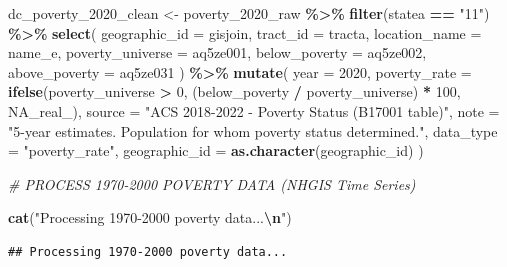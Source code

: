 \documentclass[
]{article}
\newenvironment{Shaded}{\begin{snugshade}}{\end{snugshade}}
\newcommand{\AttributeTok}[1]{\textcolor[rgb]{0.13,0.29,0.53}{#1}}
\newcommand{\CommentTok}[1]{\textcolor[rgb]{0.56,0.35,0.01}{\textit{#1}}}
\newcommand{\ConstantTok}[1]{\textcolor[rgb]{0.56,0.35,0.01}{#1}}
\newcommand{\DecValTok}[1]{\textcolor[rgb]{0.00,0.00,0.81}{#1}}
\newcommand{\FunctionTok}[1]{\textcolor[rgb]{0.13,0.29,0.53}{\textbf{#1}}}
\newcommand{\NormalTok}[1]{#1}
\newcommand{\OtherTok}[1]{\textcolor[rgb]{0.56,0.35,0.01}{#1}}
\newcommand{\SpecialCharTok}[1]{\textcolor[rgb]{0.81,0.36,0.00}{\textbf{#1}}}
\newcommand{\StringTok}[1]{\textcolor[rgb]{0.31,0.60,0.02}{#1}}
\begin{document}
\begin{Shaded}
\begin{Highlighting}[]
\NormalTok{dc\_poverty\_2020\_clean }\OtherTok{\textless{}{-}}\NormalTok{ poverty\_2020\_raw }\SpecialCharTok{\%\textgreater{}\%}
  \FunctionTok{filter}\NormalTok{(statea }\SpecialCharTok{==} \StringTok{"11"}\NormalTok{) }\SpecialCharTok{\%\textgreater{}\%}
  \FunctionTok{select}\NormalTok{(}
    \AttributeTok{geographic\_id =}\NormalTok{ gisjoin,}
    \AttributeTok{tract\_id =}\NormalTok{ tracta,}
    \AttributeTok{location\_name =}\NormalTok{ name\_e,}
    \AttributeTok{poverty\_universe =}\NormalTok{ aq5ze001,}
    \AttributeTok{below\_poverty =}\NormalTok{ aq5ze002,}
    \AttributeTok{above\_poverty =}\NormalTok{ aq5ze031}
\NormalTok{  ) }\SpecialCharTok{\%\textgreater{}\%}
  \FunctionTok{mutate}\NormalTok{(}
    \AttributeTok{year =} \DecValTok{2020}\NormalTok{,}
    \AttributeTok{poverty\_rate =} \FunctionTok{ifelse}\NormalTok{(poverty\_universe }\SpecialCharTok{\textgreater{}} \DecValTok{0}\NormalTok{, (below\_poverty }\SpecialCharTok{/}\NormalTok{ poverty\_universe) }\SpecialCharTok{*} \DecValTok{100}\NormalTok{, }\ConstantTok{NA\_real\_}\NormalTok{),}
    \AttributeTok{source =} \StringTok{"ACS 2018{-}2022 {-} Poverty Status (B17001 table)"}\NormalTok{,}
    \AttributeTok{note =} \StringTok{"5{-}year estimates. Population for whom poverty status determined."}\NormalTok{,}
    \AttributeTok{data\_type =} \StringTok{"poverty\_rate"}\NormalTok{,}
    \AttributeTok{geographic\_id =} \FunctionTok{as.character}\NormalTok{(geographic\_id)}
\NormalTok{  )}


\CommentTok{\# PROCESS 1970{-}2000 POVERTY DATA (NHGIS Time Series)}

\FunctionTok{cat}\NormalTok{(}\StringTok{"Processing 1970{-}2000 poverty data...}\SpecialCharTok{\textbackslash{}n}\StringTok{"}\NormalTok{)}
\end{Highlighting}
\end{Shaded}

\begin{verbatim}
## Processing 1970-2000 poverty data...
\end{verbatim}
\end{document}
